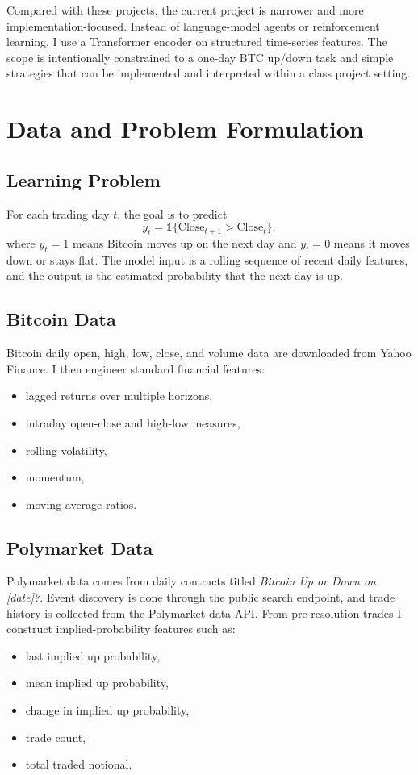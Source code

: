 \documentclass[conference]{IEEEtran}
\begin{document}
Compared with these projects, the current project is narrower and more implementation-focused. Instead of language-model agents or reinforcement learning, I use a Transformer encoder on structured time-series features. The scope is intentionally constrained to a one-day BTC up/down task and simple strategies that can be implemented and interpreted within a class project setting.

\section{Data and Problem Formulation}
\subsection{Learning Problem}
For each trading day $t$, the goal is to predict
\[
y_t = \mathbb{1}\{\text{Close}_{t+1} > \text{Close}_t\},
\]
where $y_t=1$ means Bitcoin moves up on the next day and $y_t=0$ means it moves down or stays flat. The model input is a rolling sequence of recent daily features, and the output is the estimated probability that the next day is up.

\subsection{Bitcoin Data}
Bitcoin daily open, high, low, close, and volume data are downloaded from Yahoo Finance. I then engineer standard financial features:
\begin{itemize}
\item lagged returns over multiple horizons,
\item intraday open-close and high-low measures,
\item rolling volatility,
\item momentum,
\item moving-average ratios.
\end{itemize}

\subsection{Polymarket Data}
Polymarket data comes from daily contracts titled \emph{Bitcoin Up or Down on [date]?}. Event discovery is done through the public search endpoint, and trade history is collected from the Polymarket data API. From pre-resolution trades I construct implied-probability features such as:
\begin{itemize}
\item last implied up probability,
\item mean implied up probability,
\item change in implied up probability,
\item trade count,
\item total traded notional.
\end{itemize}
\end{document}
